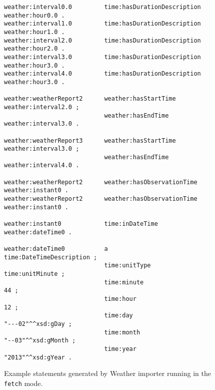 \begin{figure}
\begin{lstlisting}
weather:interval0.0         time:hasDurationDescription           weather:hour0.0 .
weather:interval1.0         time:hasDurationDescription           weather:hour1.0 .
weather:interval2.0         time:hasDurationDescription           weather:hour2.0 .
weather:interval3.0         time:hasDurationDescription           weather:hour3.0 .
weather:interval4.0         time:hasDurationDescription           weather:hour3.0 .

weather:weatherReport2      weather:hasStartTime                  weather:interval2.0 ;
                            weather:hasEndTime                    weather:interval3.0 .

weather:weatherReport3      weather:hasStartTime                  weather:interval3.0 ;
                            weather:hasEndTime                    weather:interval4.0 .

weather:weatherReport2      weather:hasObservationTime            weather:instant0 .
weather:weatherReport2      weather:hasObservationTime            weather:instant0 .

weather:instant0            time:inDateTime                       weather:dateTime0 .

weather:dateTime0           a                                     time:DateTimeDescription ;
                            time:unitType                         time:unitMinute ;
                            time:minute                           44 ;
                            time:hour                             12 ;
                            time:day                              "---02"^^xsd:gDay ;
                            time:month                            "--03"^^xsd:gMonth ;
                            time:year                             "2013"^^xsd:gYear .
\end{lstlisting}
\caption{Example statements generated by Weather importer running in the \texttt{fetch} mode.}
\label{fig:importer_timestamps1}
\end{figure}

